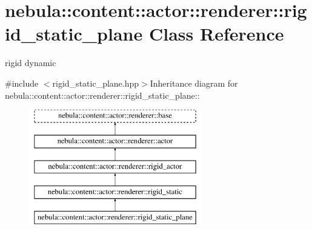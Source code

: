 \hypertarget{classnebula_1_1content_1_1actor_1_1renderer_1_1rigid__static__plane}{
\section{nebula::content::actor::renderer::rigid\_\-static\_\-plane Class Reference}
\label{classnebula_1_1content_1_1actor_1_1renderer_1_1rigid__static__plane}
}


rigid dynamic  


{\ttfamily \#include $<$rigid\_\-static\_\-plane.hpp$>$}Inheritance diagram for nebula::content::actor::renderer::rigid\_\-static\_\-plane::\begin{figure}[H]
\begin{center}
\leavevmode
\includegraphics[height=5cm]{classnebula_1_1content_1_1actor_1_1renderer_1_1rigid__static__plane}
\end{center}
\end{figure}
